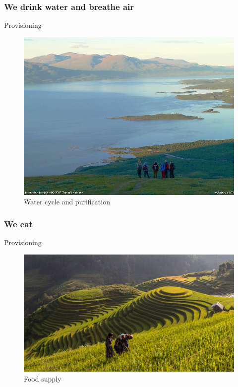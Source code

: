 \documentclass{beamer}
\begin{document}
	\begin{frame}
		\frametitle{We drink water and breathe air}
		\begin{block}{Provisioning}
				\begin{figure}				
				\centering
		    	\includegraphics[height=0.7\textheight,width=\textwidth]{tornetrask.jpg}		    	    
				\caption{Water cycle and purification}
		    	\end{figure}
		\end{block}
	\end{frame}

	\begin{frame}
		\frametitle{We eat}
		\begin{block}{Provisioning}
				\begin{figure}				
				\centering
		    	\includegraphics[height=0.7\textheight,width=\textwidth]{food.jpg}		    	    
				\caption{Food supply}
		    	\end{figure}
		\end{block}
	\end{frame}
\end{document}
